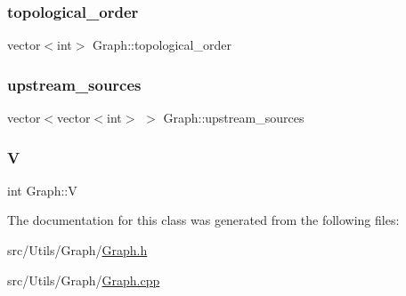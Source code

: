 \mbox{\label{classGraph_ad18af6207537a43b3cf53b56acaf92fd_ad18af6207537a43b3cf53b56acaf92fd}} 
\subsubsection{\texorpdfstring{topological\+\_\+order}{topological\_order}}
{\footnotesize\ttfamily vector$<$int$>$ Graph\+::topological\+\_\+order\hspace{0.3cm}{\ttfamily [protected]}}

\mbox{\label{classGraph_a2b9dc8c44ac87d67b061af1bf8dab2fa_a2b9dc8c44ac87d67b061af1bf8dab2fa}} 
\subsubsection{\texorpdfstring{upstream\+\_\+sources}{upstream\_sources}}
{\footnotesize\ttfamily vector$<$vector$<$int$>$ $>$ Graph\+::upstream\+\_\+sources\hspace{0.3cm}{\ttfamily [protected]}}

\mbox{\label{classGraph_a2b722f7cfa7a21e4cb5fae488b3d4dcc_a2b722f7cfa7a21e4cb5fae488b3d4dcc}} 
\subsubsection{\texorpdfstring{V}{V}}
{\footnotesize\ttfamily int Graph\+::V\hspace{0.3cm}{\ttfamily [protected]}}



The documentation for this class was generated from the following files\+:\begin{DoxyCompactItemize}
\item 
src/\+Utils/\+Graph/\mbox{\hyperlink{Graph_8h}{Graph.\+h}}\item 
src/\+Utils/\+Graph/\mbox{\hyperlink{Graph_8cpp}{Graph.\+cpp}}\end{DoxyCompactItemize}
